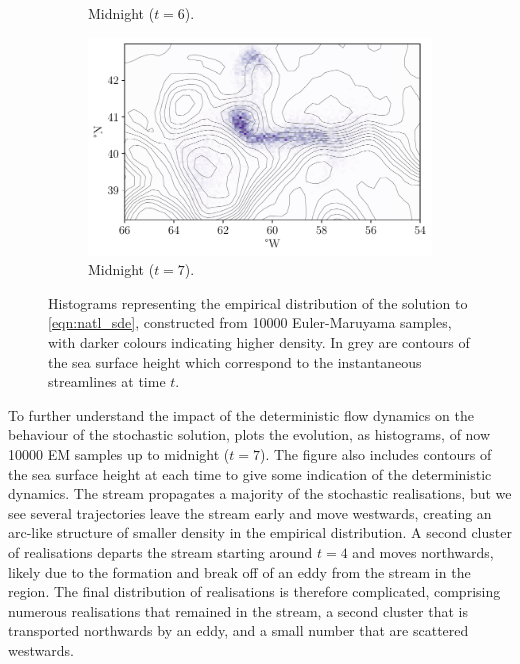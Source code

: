 \begin{figure}
\begin{subfigure}{0.49\textwidth}
		\caption{Midnight  (\(t = 6\)).}
		\label{fig:na_hist_t3_5}
	\end{subfigure}
	\begin{subfigure}{0.49\textwidth}
		\includegraphics[width=\textwidth]{chp06_applications/figures/gulf_stream/rels_ssh_7.0}
		\caption{Midnight  (\(t = 7\)).}
		\label{fig:na_hist_t3_6}
	\end{subfigure}
	\caption{Histograms representing the empirical distribution of the solution to \cref{eqn:natl_sde}, constructed from 10000 Euler-Maruyama samples, with darker colours indicating higher density.
		In grey are contours of the sea surface height which correspond to the instantaneous streamlines at time \(t\).}
	\label{fig:na_hist_t3}
\end{figure}


To further understand the impact of the deterministic flow dynamics on the behaviour of the stochastic solution,  plots the evolution, as histograms, of now 10000 EM samples up to midnight  (\(t = 7\)).
The figure also includes contours of the sea surface height at each time to give some indication of the deterministic dynamics.
The stream propagates a majority of the stochastic realisations, but we see several trajectories leave the stream early and move westwards, creating an arc-like structure of smaller density in the empirical distribution.
A second cluster of realisations departs the stream starting around \(t = 4\) and moves northwards, likely due to the formation and break off of an eddy from the stream in the region.
The final distribution of realisations is therefore complicated, comprising numerous realisations that remained in the stream, a second cluster that is transported northwards by an eddy, and a small number that are scattered westwards.

